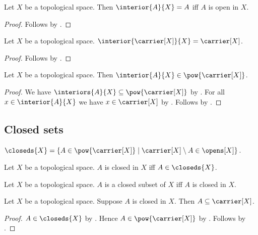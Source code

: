 \begin{corollary}\label{interior_eq_self_iff_open}
    Let $X$ be a topological space.
    Then $\interior{A}{X} = A$ iff $A$ is open in $X$.
\end{corollary}
\begin{proof}
    Follows by
        .
\end{proof}

\begin{proposition}\label{interior_carrier}
    Let $X$ be a topological space.
    $\interior{\carrier[X]}{X} = \carrier[X]$.
\end{proposition}
\begin{proof}
    Follows by .
\end{proof}

\begin{proposition}\label{interior_type}
    Let $X$ be a topological space.
    Then $\interior{A}{X}\in\pow{\carrier[X]}$.
\end{proposition}
\begin{proof}
    We have $\interiors{A}{X}\subseteq \pow{\carrier[X]}$
        by .
    For all $x\in\interior{A}{X}$ we have $x\in\carrier[X]$
        by .
    Follows by .
\end{proof}

\subsection{Closed sets}

\begin{definition}\label{closeds}
    $\closeds{X} = \{ A\in\pow{\carrier[X]}\mid
        \carrier[X]\setminus A\in\opens[X]\}$.
\end{definition}

\begin{definition}\label{is_closed_in}
    Let $X$ be a topological space.
    $A$ is closed in $X$ iff $A\in\closeds{X}$.
\end{definition}

\begin{definition}\label{closed_subset_of}
    Let $X$ be a topological space.
    $A$ is a closed subset of $X$ iff $A$ is closed in $X$.
\end{definition}

\begin{proposition}\label{closed_in_subseteq_carrier}
    Let $X$ be a topological space.
    Suppose $A$ is closed in $X$.
    Then $A\subseteq\carrier[X]$.
\end{proposition}
\begin{proof}
    $A\in\closeds{X}$ by .
    Hence $A\in\pow{\carrier[X]}$ by .
    Follows by .
\end{proof}

